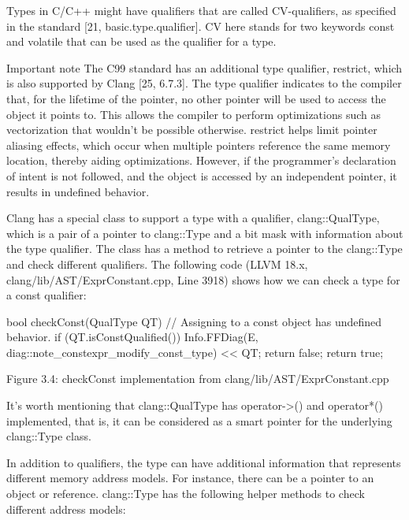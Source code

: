 Types in C/C++ might have qualifiers that are called CV-qualifiers, as specified in the standard [21, basic.type.qualifier]. CV here stands for two keywords const and volatile that can be used as the qualifier for a type.

\begin{myNotic}{Important note}
The C99 standard has an additional type qualifier, restrict, which is also supported by Clang [25, 6.7.3]. The type qualifier indicates to the compiler that, for the lifetime of the pointer, no other pointer will be used to access the object it points to. This allows the compiler to perform optimizations such as vectorization that wouldn't be possible otherwise. restrict helps limit pointer aliasing effects, which occur when multiple pointers reference the same memory location, thereby aiding optimizations. However, if the programmer's declaration of intent is not followed, and the object is accessed by an independent pointer, it results in undefined behavior.
\end{myNotic}

Clang has a special class to support a type with a qualifier, clang::QualType, which is a pair of a pointer to clang::Type and a bit mask with information about the type qualifier. The class has a method to retrieve a pointer to the clang::Type and check different qualifiers. The following code (LLVM 18.x, clang/lib/AST/ExprConstant.cpp, Line 3918) shows how we can check a type for a const qualifier:

\begin{cpp}
bool checkConst(QualType QT) {
  // Assigning to a const object has undefined behavior.
  if (QT.isConstQualified()) {
    Info.FFDiag(E, diag::note_constexpr_modify_const_type) << QT;
    return false;
  }
  return true;
}
\end{cpp}

\begin{center}
Figure 3.4: checkConst implementation from clang/lib/AST/ExprConstant.cpp
\end{center}

It's worth mentioning that clang::QualType has operator->() and operator*() implemented, that is, it can be considered as a smart pointer for the underlying clang::Type class.

In addition to qualifiers, the type can have additional information that represents different memory address models. For instance, there can be a pointer to an object or reference. clang::Type has the following helper methods to check different address models:

